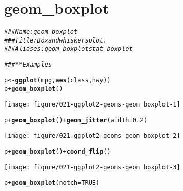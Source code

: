 \documentclass[a4paper,titlepage]{tufte-handout}\usepackage[]{graphicx}\usepackage[]{color}
\makeatletter
\def\maxwidth{ %
  \ifdim\Gin@nat@width>\linewidth
    \linewidth
  \else
    \Gin@nat@width
  \fi
}
\newcommand{\hlnum}[1]{\textcolor[rgb]{0.686,0.059,0.569}{#1}}%
\newcommand{\hlcom}[1]{\textcolor[rgb]{0.678,0.584,0.686}{\textit{#1}}}%
\newcommand{\hlopt}[1]{\textcolor[rgb]{0,0,0}{#1}}%
\newcommand{\hlstd}[1]{\textcolor[rgb]{0.345,0.345,0.345}{#1}}%
\newcommand{\hlkwb}[1]{\textcolor[rgb]{0.69,0.353,0.396}{#1}}%
\newcommand{\hlkwc}[1]{\textcolor[rgb]{0.333,0.667,0.333}{#1}}%
\newcommand{\hlkwd}[1]{\textcolor[rgb]{0.737,0.353,0.396}{\textbf{#1}}}%
\newenvironment{kframe}{%
 \def\at@end@of@kframe{}%
 \ifinner\ifhmode%
  \def\at@end@of@kframe{\end{minipage}}%
  \begin{minipage}{\columnwidth}%
 \fi\fi%
 \def\FrameCommand##1{\hskip\@totalleftmargin \hskip-\fboxsep
 \colorbox{shadecolor}{##1}\hskip-\fboxsep
     \hskip-\linewidth \hskip-\@totalleftmargin \hskip\columnwidth}%
 \MakeFramed {\advance\hsize-\width
   \@totalleftmargin\z@ \linewidth\hsize
   \@setminipage}}%
 {\par\unskip\endMakeFramed%
 \at@end@of@kframe}
\newenvironment{knitrout}{}{} %
\makeatother
\begin{document}
\section{geom\_boxplot}

\begin{knitrout}
\color{fgcolor}\begin{kframe}
\begin{alltt}
\hlcom{### Name: geom_boxplot}
\hlcom{### Title: Box and whiskers plot.}
\hlcom{### Aliases: geom_boxplot stat_boxplot}

\hlcom{### ** Examples}

\hlstd{p} \hlkwb{<-} \hlkwd{ggplot}\hlstd{(mpg,} \hlkwd{aes}\hlstd{(class, hwy))}
\hlstd{p} \hlopt{+} \hlkwd{geom_boxplot}\hlstd{()}
\end{alltt}
\end{kframe}
\texttt{[image: figure/021-ggplot2-geoms-geom\_boxplot-1]} 
\begin{kframe}\begin{alltt}
\hlstd{p} \hlopt{+} \hlkwd{geom_boxplot}\hlstd{()} \hlopt{+} \hlkwd{geom_jitter}\hlstd{(}\hlkwc{width} \hlstd{=} \hlnum{0.2}\hlstd{)}
\end{alltt}
\end{kframe}
\texttt{[image: figure/021-ggplot2-geoms-geom\_boxplot-2]} 
\begin{kframe}\begin{alltt}
\hlstd{p} \hlopt{+} \hlkwd{geom_boxplot}\hlstd{()} \hlopt{+} \hlkwd{coord_flip}\hlstd{()}
\end{alltt}
\end{kframe}
\texttt{[image: figure/021-ggplot2-geoms-geom\_boxplot-3]} 
\begin{kframe}\begin{alltt}
\hlstd{p} \hlopt{+} \hlkwd{geom_boxplot}\hlstd{(}\hlkwc{notch} \hlstd{=} \hlnum{TRUE}\hlstd{)}
\end{alltt}



\end{kframe}
\end{knitrout}
\end{document}
